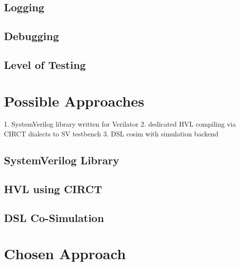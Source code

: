 \documentclass[11pt]{report}
\begin{document}
\subsection{Logging} %

\subsection{Debugging} %

\subsection{Level of Testing} %

\section{Possible Approaches} %

1. SystemVerilog library written for Verilator
2. dedicated HVL compiling via CIRCT dialects to SV testbench
3. DSL cosim with simulation backend

\subsection{SystemVerilog Library} %

\subsection{HVL using CIRCT} %

\subsection{DSL Co-Simulation} %

\section{Chosen Approach} %
\end{document}
